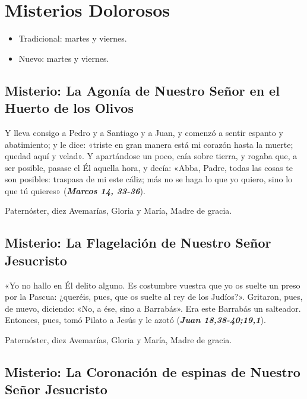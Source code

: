 \documentclass[./main.tex]{subfiles}
\newcounter{sorrowful-counter}
\begin{document}
\section*{Misterios Dolorosos}
\begin{itemize}
      \item Tradicional: martes y viernes.
      \item Nuevo: martes y viernes.
\end{itemize}

\subsection*{ Misterio: La Agonía de Nuestro Señor en el Huerto de los Olivos}

Y lleva consigo a Pedro y a Santiago y a Juan, y comenzó a sentir espanto y abatimiento; y le dice:
«triste en gran manera está mi corazón hasta la muerte; quedad aquí y velad». Y apartándose un poco,
caía sobre tierra, y rogaba que, a ser posible, pasase el Él aquella hora, y decía: «Abba, Padre, todas las cosas te son posibles:
traspasa de mi este cáliz; más no se haga lo que yo quiero, sino lo que tú quieres» (\textbf{\emph{Marcos 14, 33-36}}).

\begin{center}
      Paternóster, diez Avemarías, Gloria y María, Madre de gracia.
\end{center}

\subsection*{ Misterio: La Flagelación de Nuestro Señor Jesucristo}

«Yo no hallo en Él delito alguno. Es costumbre vuestra que yo os suelte un preso por la Pascua:
¿queréis, pues, que os suelte al rey de los Judíos?». Gritaron, pues, de nuevo, diciendo: «No, a ése, sino a Barrabás».
Era este Barrabás un salteador. Entonces, pues, tomó Pilato a Jesús y le azotó (\textbf{\emph{Juan 18,38-40;19,1}}).

\begin{center}
      Paternóster, diez Avemarías, Gloria y María, Madre de gracia.
\end{center}

\subsection*{ Misterio: La Coronación de espinas de Nuestro Señor Jesucristo}
\end{document}
